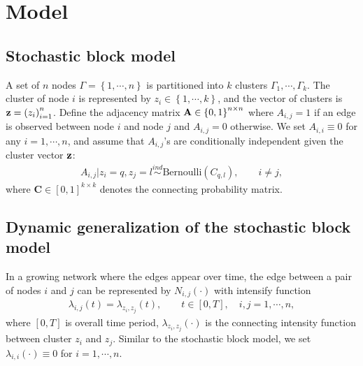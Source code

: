 
\section{Model} \label{sec:model}


\subsection{Stochastic block model} %

A set of $n$ nodes $\Gamma=\left\{ 1,\cdots,n \right\}$ is partitioned into $k$ clusters $\Gamma_1,\cdots,\Gamma_k$. 
The cluster of node $i$ is represented by $z_i\in \left\{ 1,\cdots,k \right\}$, and the vector of clusters is $\mathbf{z}=\left( z_i \right)_{i=1}^n $. 
Define the adjacency matrix $\mathbf{A}\in \left\{ 0,1\right\}^{n\times n}$ where  $A_{i,j}= 1$ if an edge is observed between node $i$ and node $j$ and $A_{i,j}=0$ otherwise.
We set ${A}_{i,i}\equiv 0$  for any $i=1,\cdots,n$, 
and assume that $A_{i,j}$'s are conditionally independent given the cluster vector $\mathbf{z}$:
\begin{align*}
{A}_{i,j}|z_i=q,z_j=l \overset{ind}{\sim} \text{Bernoulli}({C}_{q,l}), \qquad i\neq j,
\end{align*}
where $\mathbf{C}\in [0,1]^{k\times k}$ denotes the  connecting probability matrix.




\subsection{Dynamic generalization of the stochastic block model}



In a growing network where the edges appear over time, 
the edge between a pair of nodes $i$ and $j$ can be represented by $N_{i,j}(\cdot)$ with intensify function
\begin{align*}
\lambda_{i,j}(t)=\lambda_{z_i,z_j}(t), \qquad t\in[0,T],\quad i,j=1,\cdots,n, 
\end{align*}
where $[0,T]$ is overall time period,
$\lambda_{z_i,z_j}(\cdot)$ is the connecting intensity function between cluster $z_i$ and $z_j$. 
Similar to the stochastic block model, we set $\lambda_{i,i}(\cdot)\equiv 0$ for $i=1,\cdots,n$.


